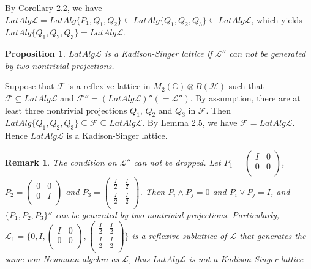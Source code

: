 \documentclass[12pt]{article}
\newtheorem{prop}{Proposition}[section]
\newtheorem{remark}{Remark}[section]
\newcommand{\HHH}{\mathcal H} %
\newcommand{\LLL}{\mathcal L} %
\newcommand{\C}{\mathbb C} %
\def\L{{\mathcal{L}}}
\begin{document}
{By Corollary 2.2, we have
$LatAlg\L=LatAlg\{P_1, Q_1, Q_2\}\subseteq LatAlg\{Q_1, Q_2,
Q_3\}\subseteq LatAlg\L$, which yields $LatAlg\{Q_1, Q_2,
Q_3\}= LatAlg\L$.

\vspace{2mm}

\begin{prop}
 $LatAlg\LLL$ is  a Kadison-Singer
 lattice if $\LLL''$ can not be generated by two nontrivial
 projections.
\end{prop}

 \quad Suppose that $\mathcal{F}$ is a reflexive lattice in
 $M_2(\C)\otimes B(\HHH)$ such that $\mathcal{F}\subseteq LatAlg\L$ and $\mathcal{F}''=(LatAlg\L)''(=\LLL'')$.
 By assumption, there are at least three nontrivial projections
 $Q_1$, $Q_2$ and $Q_3$ in $\mathcal{F}$. Then $LatAlg\{Q_1,Q_2,Q_3\}\subseteq\mathcal{F}\subseteq
 LatAlg\L$. By Lemma 2.5, we have $\mathcal{F}=LatAlg\L$. Hence
 $LatAlg\LLL$ is  a Kadison-Singer lattice.
\vspace{2mm}

\begin{remark} The condition on $\LLL''$ can not be dropped. Let $P_1=\left(
     \begin{array}{cc}
     I & 0 \\
       0 & 0 \\
     \end{array}
   \right)$, $P_2=\left(
     \begin{array}{cc}
     0 & 0 \\
       0 & I \\
     \end{array}
   \right)$ and $P_3=\left(
     \begin{array}{cc}
     \frac I2 &\frac I2 \\
      \frac I2 & \frac I2 \\
     \end{array}
   \right)$. Then $P_i\wedge P_j=0$ and $P_i\vee P_j=I$,
   and $\{P_1,P_2,P_3\}''$ can be generated by two nontrivial
   projections. Particularly, $\LLL_1=\{0, I,\left(
     \begin{array}{cc}
     I & 0 \\
       0 & 0 \\
     \end{array}
   \right), \left(
     \begin{array}{cc}
     \frac I2 &\frac I2 \\
      \frac I2 & \frac I2 \\
     \end{array}
   \right)\}$ is a reflexive sublattice of $\LLL$ that generates the same von Neumann
   algebra as $\LLL$, thus $LatAlg\LLL$ is not  a Kadison-Singer
 lattice
\end{remark}

}
\end{document}
